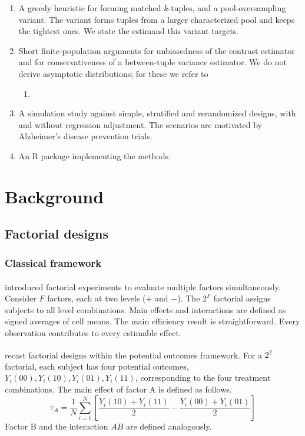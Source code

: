 \documentclass[
  11pt,
]{article}
\providecommand{\tightlist}{%
  \setlength{\itemsep}{0pt}\setlength{\parskip}{0pt}}
\begin{document}
\begin{enumerate}
\def\labelenumi{\arabic{enumi}.}
\tightlist
\item
  A greedy heuristic for forming matched \(k\)-tuples, and a
  pool-oversampling variant. The variant forms tuples from a
  larger characterized pool and keeps the tightest ones. We
  state the estimand this variant targets.
\item
  Short finite-population arguments for unbiasedness of the
  contrast estimator and for conservativeness of a
  between-tuple variance estimator. We do not derive
  asymptotic distributions; for these we refer to

  \begin{enumerate}
  \def\labelenumii{\arabic{enumii}.}
  \tightlist
  \item
  \end{enumerate}
\item
  A simulation study against simple, stratified and
  rerandomized designs, with and without regression
  adjustment. The scenarios are motivated by Alzheimer's
  disease prevention trials.
\item
  An R package implementing the methods.
\end{enumerate}

\section{Background}\label{background}

\subsection{Factorial designs}\label{factorial-designs}

\subsubsection{Classical framework}\label{classical-framework}

\textsuperscript{} introduced factorial experiments
to evaluate multiple factors simultaneously. Consider \(F\)
factors, each at two levels (\(+\) and \(-\)). The \(2^F\) factorial
assigns subjects to all level combinations. Main effects and
interactions are defined as signed averages of cell means. The
main efficiency result is straightforward. Every observation
contributes to every estimable effect.

\textsuperscript{} recast factorial designs within
the potential outcomes framework. For a \(2^2\) factorial, each
subject has four potential outcomes,
\(Y_i(00), Y_i(10), Y_i(01), Y_i(11)\), corresponding to the
four treatment combinations. The main effect of factor A is
defined as follows.
\begin{equation}
  \tau_A = \frac{1}{N} \sum_{i=1}^{N}
    \left[ \frac{Y_i(10) + Y_i(11)}{2} -
           \frac{Y_i(00) + Y_i(01)}{2} \right]
\end{equation}
Factor B and the interaction \(AB\) are defined analogously.
\end{document}
